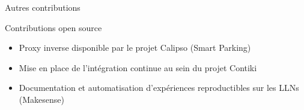 \begin{frame}{Autres contributions}
  

  \begin{block}{Contributions open source}
    \begin{itemize}
      \item Proxy inverse disponible par le projet Calipso (Smart Parking) %
      \item Mise en place de l'intégration continue au sein du projet Contiki %
      \item Documentation et automatisation d'expériences reproductibles sur les LLNs (Makesense) %
    \end{itemize}
  \end{block}




\end{frame}

